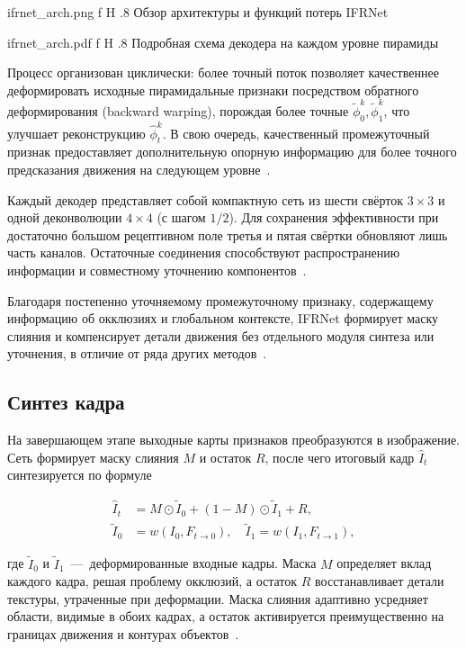 {ifrnet_arch.png}
{f}
{H}
{.8\textwidth}
{Обзор архитектуры и функций потерь IFRNet~\cite{IFRNet2022}}

{ifrnet_arch.pdf}
{f}
{H}
{.8\textwidth}
{Подробная схема декодера на каждом уровне пирамиды~\cite{IFRNet2022}}

Процесс организован циклически: более точный поток позволяет качественнее деформировать исходные пирамидальные признаки посредством обратного деформирования (backward warping), порождая более точные $\tilde{\phi}_0^k, \tilde{\phi}_1^k$, что улучшает реконструкцию $\hat{\phi}_t^k$. В свою очередь, качественный промежуточный признак предоставляет дополнительную опорную информацию для более точного предсказания движения на следующем уровне~\cite{IFRNet2022}.

Каждый декодер представляет собой компактную сеть из шести свёрток $3\times3$ и одной деконволюции $4\times4$ (с шагом $1/2$). Для сохранения эффективности при достаточно большом рецептивном поле третья и пятая свёртки обновляют лишь часть каналов. Остаточные соединения способствуют распространению информации и совместному уточнению компонентов~\cite{IFRNet2022}.

Благодаря постепенно уточняемому промежуточному признаку, содержащему информацию об окклюзиях и глобальном контексте, IFRNet формирует маску слияния и компенсирует детали движения без отдельного модуля синтеза или уточнения, в отличие от ряда других методов~\cite{IFRNet2022}.

\subsection*{Синтез кадра}

На завершающем этапе выходные карты признаков преобразуются в изображение. Сеть формирует маску слияния $M$ и остаток $R$, после чего итоговый кадр $\hat{I}_t$ синтезируется по формуле

\begin{align*}
	\hat{I}_t &= M \odot \tilde{I}_0 + (1 - M) \odot \tilde{I}_1 + R, \\
	\tilde{I}_0 &= w(I_0, F_{t\to0}), \quad \tilde{I}_1 = w(I_1, F_{t\to1}),
\end{align*}

где $\tilde{I}_0$ и $\tilde{I}_1$~---~деформированные входные кадры. Маска $M$ определяет вклад каждого кадра, решая проблему окклюзий, а остаток $R$ восстанавливает детали текстуры, утраченные при деформации. Маска слияния адаптивно усредняет области, видимые в обоих кадрах, а остаток активируется преимущественно на границах движения и контурах объектов~\cite{IFRNet2022}.

